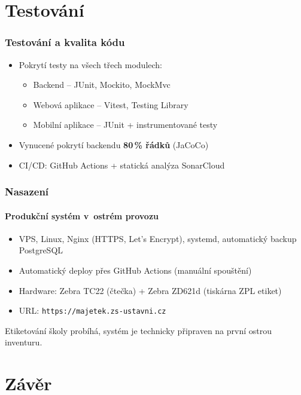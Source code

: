 \documentclass[czech,blue]{ctufit-presentation}
\begin{document}
\section{Testování}

\begin{frame}
	\frametitle{Testování a kvalita kódu}
	\begin{itemize}
		\item Pokrytí testy na všech třech modulech:
			\begin{itemize}
				\item Backend -- JUnit, Mockito, MockMvc
				\item Webová aplikace -- Vitest, Testing Library
				\item Mobilní aplikace -- JUnit + instrumentované testy
			\end{itemize}
		\item Vynucené pokrytí backendu \textbf{80\,\% řádků} (JaCoCo)
		\item CI/CD: GitHub Actions + statická analýza SonarCloud
	\end{itemize}
\end{frame}

\begin{frame}
	\frametitle{Nasazení}
	\framesubtitle{Produkční systém v~ostrém provozu}
	\begin{itemize}
		\item VPS, Linux, Nginx (HTTPS, Let's Encrypt), systemd, automatický backup PostgreSQL
		\item Automatický deploy přes GitHub Actions (manuální spouštění)
		\item Hardware: Zebra TC22 (čtečka) + Zebra ZD621d (tiskárna ZPL etiket)
		\item URL: \texttt{https://majetek.zs-ustavni.cz}
	\end{itemize}
	\vspace{0.5em}
	{\small Etiketování školy probíhá, systém je technicky připraven na první ostrou inventuru.}
\end{frame}

\section{Závěr}
\end{document}
